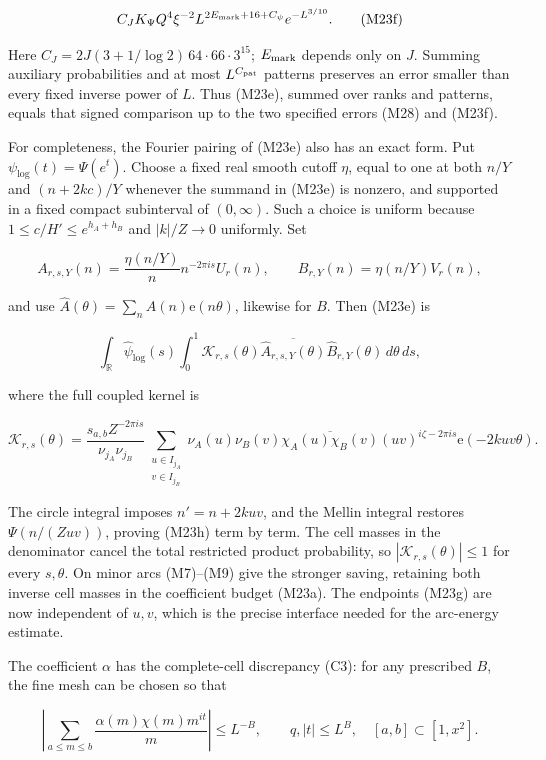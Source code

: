 \[
C_JK_\Psi Q^4\xi^{-2}
 L^{2E_{\rm mark}+16+C_\psi}e^{-L^{3/10}}.
\tag{M23f}
\]

Here \(C_J=2J(3+1/\log2)\,64\cdot66\cdot3^{15}\); \(E_{\rm mark}\)
depends only on \(J\). Summing auxiliary probabilities and at most
\(L^{C_{\rm pat}}\) patterns preserves an error smaller than every fixed
inverse power of \(L\). Thus (M23e), summed over ranks and patterns,
equals that signed comparison up to the two specified errors (M28) and
(M23f).

For completeness, the Fourier pairing of (M23e) also has an exact form.
Put \(\psi_{\log}(t)=\Psi(e^t)\). Choose a fixed real smooth cutoff
\(\eta\), equal to one at both \(n/Y\) and \((n+2kc)/Y\) whenever the
summand in (M23e) is nonzero, and supported in a fixed compact
subinterval of \((0,\infty)\). Such a choice is uniform because
\(1\le c/H'\le e^{h_A+h_B}\) and \(|k|/Z\to0\) uniformly. Set

\[
A_{r,s,Y}(n)=\frac{\eta(n/Y)}{n}n^{-2\pi is}U_r(n),\qquad
B_{r,Y}(n)=\eta(n/Y)V_r(n),
\tag{M23g}
\]

and use \(\widehat A(\theta)=\sum_n A(n)\mathrm e(n\theta)\), likewise
for \(B\). Then (M23e) is

\[
\int_{\mathbb R}\widehat\psi_{\log}(s)
 \int_0^1\mathcal K_{r,s}(\theta)
       \overline{\widehat A_{r,s,Y}(\theta)}
       \widehat B_{r,Y}(\theta)\,d\theta\,ds,
\tag{M23h}
\]

where the full coupled kernel is

\[
\mathcal K_{r,s}(\theta)=
\frac{s_{a,b}Z^{-2\pi is}}{\nu_{j_A}\nu_{j_B}}
\sum_{\substack{u\in I_{j_A}\\v\in I_{j_B}}}
\nu_A(u)\nu_B(v)\overline{\chi_A(u)\chi_B(v)}
(uv)^{i\zeta-2\pi is}\mathrm e(-2kuv\theta).
\tag{M23i}
\]

The circle integral imposes \(n'=n+2kuv\), and the Mellin integral
restores \(\Psi(n/(Zuv))\), proving (M23h) term by term. The cell masses
in the denominator cancel the total restricted product probability, so
\(|\mathcal K_{r,s}(\theta)|\le1\) for every \(s,\theta\). On minor arcs
(M7)--(M9) give the stronger saving, retaining both inverse cell masses
in the coefficient budget (M23a). The endpoints (M23g) are now
independent of \(u,v\), which is the precise interface needed for the
arc-energy estimate.

The coefficient \(\alpha\) has the complete-cell discrepancy (C3): for
any prescribed \(B\), the fine mesh can be chosen so that

\[
\left|\sum_{a\le m\le b}
       \frac{\alpha(m)\chi(m)m^{it}}m\right|\le L^{-B},
\qquad q,|t|\le L^B,\quad [a,b]\subset[1,x^2]. \tag{M24}
\]

